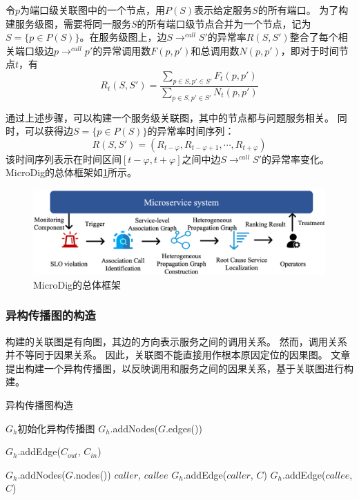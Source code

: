 令$p$为端口级关联图中的一个节点，用$P(S)$表示给定服务$S$的所有端口。
为了构建服务级图，需要将同一服务$S$的所有端口级节点合并为一个节点，记为$S = \{p\in P(S)\}$。在服务级图上，边$S\to^{call}S'$的异常率$R(S, S')$整合了每个相关端口级边$p\to^{call}p'$的异常调用数$F(p, p')$和总调用数$N(p, p')$，即对于时间节点$t$，有
\begin{equation*}
    R_t(S, S')=\frac{\displaystyle\sum_{p\in S,p'\in S'}F_t(p,p')}{\displaystyle\sum_{p\in S,p'\in S'}N_t(p,p')}
\end{equation*}

通过上述步骤，可以构建一个服务级关联图，其中的节点都与问题服务相关。
同时，可以获得边$S = \{p\in P(S)\}$的异常率时间序列：
\begin{equation*}
    R(S,S')=(R_{t-\varphi},R_{t-\varphi+1},\cdots,R_{t+\varphi})
\end{equation*}
该时间序列表示在时间区间$[t-\varphi,t+\varphi]$之间中边$S\to^{call}S'$的异常率变化。
MicroDig的总体框架如\cref{figure:MicroDig的总体框架}所示。

\begin{figure}[ht]
    \centering
    \includegraphics[width=\textwidth]{img/MicroDig框架.png}
    \caption{MicroDig的总体框架}
    \label{figure:MicroDig的总体框架}
\end{figure}

\subsubsection{异构传播图的构造}

构建的关联图是有向图，其边的方向表示服务之间的调用关系。
然而，调用关系并不等同于因果关系。
因此，关联图不能直接用作根本原因定位的因果图。
文章提出构建一个异构传播图，以反映调用和服务之间的因果关系，基于关联图进行构建。

\begin{algorithm}[!ht]
    \caption{异构传播图构造}
    \label{alg:Heterogeneous Propagation Graph Construction}
    \begin{algorithmic}[1]
        \State$G_h$\Get 初始化异构传播图
        \State$G_h$.addNodes($G$.edges())

                    \State $G_h$.addEdge($C_{out}$, $C_{in}$)
                \EndFor
            \EndFor
        \EndFor

        \State $G_h$.addNodes($G$.nodes())
            \State $caller$, $callee$\Get{}
            \State $G_h$.addEdge($caller$, $C$)
            \State $G_h$.addEdge($callee$, $C$)
        \EndFor
    \end{algorithmic}
\end{algorithm}

